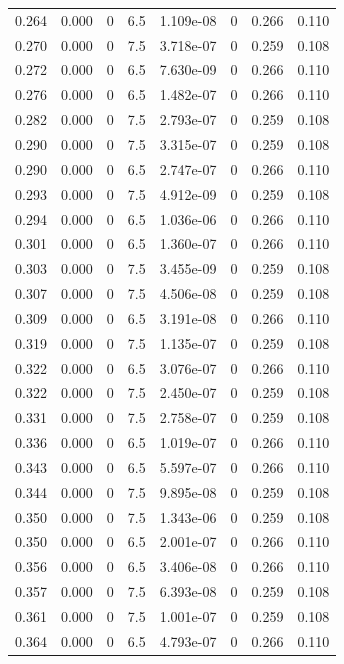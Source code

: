 \documentclass[preview]{standalone}
\begin{document}
{{{\begin{tabular}{L{1.2cm}C{1.2cm} C{0.3cm}C{0.5cm} C{1.4cm}C{1.4cm} C{1.4cm}C{1.4cm}}
  0.264  &  0.000  & 0     & 6.5 &  1.109e-08  & 0  & 0.266 &  0.110   \\ 
  0.270  &  0.000  & 0     & 7.5 &  3.718e-07  & 0  & 0.259 &  0.108   \\ 
  0.272  &  0.000  & 0     & 6.5 &  7.630e-09  & 0  & 0.266 &  0.110   \\ 
  0.276  &  0.000  & 0     & 6.5 &  1.482e-07  & 0  & 0.266 &  0.110   \\ 
  0.282  &  0.000  & 0     & 7.5 &  2.793e-07  & 0  & 0.259 &  0.108   \\ 
  0.290  &  0.000  & 0     & 7.5 &  3.315e-07  & 0  & 0.259 &  0.108   \\ 
  0.290  &  0.000  & 0     & 6.5 &  2.747e-07  & 0  & 0.266 &  0.110   \\ 
  0.293  &  0.000  & 0     & 7.5 &  4.912e-09  & 0  & 0.259 &  0.108   \\ 
  0.294  &  0.000  & 0     & 6.5 &  1.036e-06  & 0  & 0.266 &  0.110   \\ 
  0.301  &  0.000  & 0     & 6.5 &  1.360e-07  & 0  & 0.266 &  0.110   \\ 
  0.303  &  0.000  & 0     & 7.5 &  3.455e-09  & 0  & 0.259 &  0.108   \\ 
  0.307  &  0.000  & 0     & 7.5 &  4.506e-08  & 0  & 0.259 &  0.108   \\ 
  0.309  &  0.000  & 0     & 6.5 &  3.191e-08  & 0  & 0.266 &  0.110   \\ 
  0.319  &  0.000  & 0     & 7.5 &  1.135e-07  & 0  & 0.259 &  0.108   \\ 
  0.322  &  0.000  & 0     & 6.5 &  3.076e-07  & 0  & 0.266 &  0.110   \\ 
  0.322  &  0.000  & 0     & 7.5 &  2.450e-07  & 0  & 0.259 &  0.108   \\ 
  0.331  &  0.000  & 0     & 7.5 &  2.758e-07  & 0  & 0.259 &  0.108   \\ 
  0.336  &  0.000  & 0     & 6.5 &  1.019e-07  & 0  & 0.266 &  0.110   \\ 
  0.343  &  0.000  & 0     & 6.5 &  5.597e-07  & 0  & 0.266 &  0.110   \\ 
  0.344  &  0.000  & 0     & 7.5 &  9.895e-08  & 0  & 0.259 &  0.108   \\ 
  0.350  &  0.000  & 0     & 7.5 &  1.343e-06  & 0  & 0.259 &  0.108   \\ 
  0.350  &  0.000  & 0     & 6.5 &  2.001e-07  & 0  & 0.266 &  0.110   \\ 
  0.356  &  0.000  & 0     & 6.5 &  3.406e-08  & 0  & 0.266 &  0.110   \\ 
  0.357  &  0.000  & 0     & 7.5 &  6.393e-08  & 0  & 0.259 &  0.108   \\ 
  0.361  &  0.000  & 0     & 7.5 &  1.001e-07  & 0  & 0.259 &  0.108   \\ 
  0.364  &  0.000  & 0     & 6.5 &  4.793e-07  & 0  & 0.266 &  0.110   \\ 
\hline 
\end{tabular} 

}}}
\end{document}
